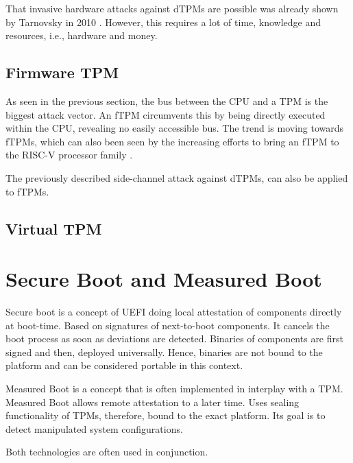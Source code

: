 That invasive hardware attacks against dTPMs are possible was already shown by Tarnovsky in 2010 \cite{tarnovsky}. However, this requires a lot of time, knowledge and resources, i.e., hardware and money.


\subsection{Firmware TPM}


As seen in the previous section, the bus between the CPU and a TPM is the biggest attack vector. An fTPM circumvents this by being directly executed within the CPU, revealing no easily accessible bus.
The trend is moving towards fTPMs, which can also been seen by the increasing efforts to bring an fTPM to the RISC-V processor family \cite{Boubakri2021}.

The previously described side-channel attack \cite{Moghimi2019} against dTPMs, can also be applied to fTPMs.

\subsection{Virtual TPM}




\section{Secure Boot and Measured Boot}

Secure boot is a concept of UEFI doing local attestation of components directly at boot-time. Based on signatures of next-to-boot components. It cancels the boot process as soon as deviations are detected. Binaries of components are first signed and then, deployed universally. Hence, binaries are not bound to the platform and can be considered portable in this context.

Measured Boot is a concept that is often implemented in interplay with a TPM. Measured Boot allows remote attestation to a later time. Uses sealing functionality of TPMs, therefore, bound to the exact platform. Its goal is to detect manipulated system configurations.

Both technologies are often used in conjunction.
